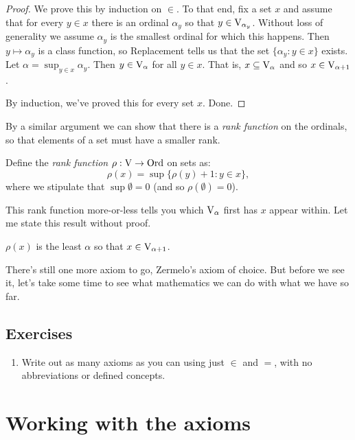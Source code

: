\documentclass[10pt]{amsart}
\begin{document}
\begin{proof}
We prove this by induction on $\in$. To that end, fix a set $x$ and assume that for every $y \in x$ there is an ordinal $\alpha_y$ so that $y \in \mathrm{V}_{\alpha_y}$. Without loss of generality we assume $\alpha_y$ is the smallest ordinal for which this happens. Then $y \mapsto \alpha_y$ is a class function, so Replacement tells us that the set $\{ \alpha_y : y \in x \}$ exists. Let $\alpha = \sup_{y \in x} \alpha_y$. Then $y \in \mathrm{V}_\alpha$ for all $y \in x$. That is, $x \subseteq \mathrm{V}_\alpha$ and so $x \in \mathrm{V}_{\alpha + 1}$. 

By induction, we've proved this for every set $x$. Done.
\end{proof}

By a similar argument we can show that there is a \emph{rank function} on the ordinals, so that elements of a set must have a smaller rank.

\begin{definition}
Define the \emph{rank function} $\rho : \mathrm{V} \to \mathrm{Ord}$ on sets as:
\[
\rho(x) = \sup \{ \rho(y) + 1 : y \in x \},
\]
where we stipulate that $\sup \emptyset = 0$ (and so $\rho(\emptyset) = 0$).
\end{definition}

This rank function more-or-less tells you which $\mathrm{V}_\alpha$ first has $x$ appear within. Let me state this result without proof.

\begin{fact}
$\rho(x)$ is the least $\alpha$ so that $x \in \mathrm{V}_{\alpha + 1}$.
\end{fact}

There's still one more axiom to go, Zermelo's axiom of choice. But before we see it, let's take some time to see what mathematics we can do with what we have so far.

\subsection*{Exercises}

\begin{enumerate}
\item Write out as many axioms as you can using just $\in$ and $=$, with no abbreviations or defined concepts.
\end{enumerate}

\newpage

\section{Working with the axioms}
\end{document}
